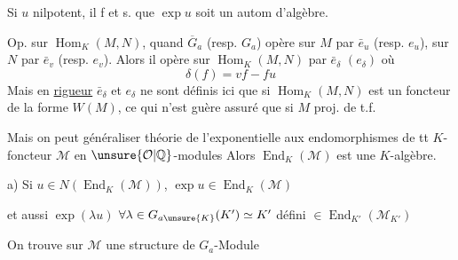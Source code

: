 Si $u$ nilpotent, il f et s. que $\exp u$ soit un autom d'algèbre.

Op. sur $\operatorname{Hom}_K(M,N)$, quand $\overline G_a$ (resp. $G_a$) opère sur $M$ par $\bar e_u$ (resp. $e_u$), sur $N$ par $\bar e_v$ (resp. $e_v$). Alors il opère sur $\operatorname{Hom}_K(M,N)$ par $\bar e_\delta$ $(e_\delta)$ où
\[
\delta(f)=vf-fu
\]
Mais en  \uline{rigueur} $\bar e_\delta$ et $e_\delta$ ne sont définis ici que si $\operatorname{Hom}_K(M,N)$ est  un foncteur de la forme $W(M)$, ce qui n'est guère assuré que si $M$ proj. de t.f.

Mais on peut généraliser théorie de l'exponentielle aux  endomorphismes de tt $K$-foncteur $\mathcal M$ en $\unsure{\mathcal O|\mathbb{Q}}$-modules
Alors $\operatorname{End}_K(\mathcal M)$ est une $K$-algèbre.

a) Si $u\in N(\operatorname{End}_K(\mathcal M))$, $\exp u\in\operatorname{End}_K(\mathcal M)$

et aussi $\exp(\lambda u)$ $\forall\lambda\in G_{a\unsure{K}}(K')\simeq K'$ défini $\in\operatorname{End}_{K'}(\mathcal M_{K'})$

On trouve sur $\mathcal M$ une structure de $G_a$-Module 
